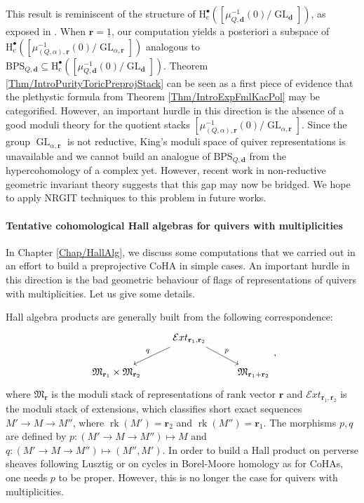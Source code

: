 \documentclass[11pt,english]{article}
\numberwithin{equation}{section}
\numberwithin{figure}{section}
\theoremstyle{definition}
\theoremstyle{plain}
\theoremstyle{remark}
\DeclareMathOperator{\GL}{GL}
\DeclareMathOperator{\rk}{rk}
\newcommand\dd{\mathbf{d}}
\newcommand\rr{\mathbf{r}}
\newcommand\HH{\mathrm{H}}
\begin{document}
This result is reminiscent of the structure of $\HH_{\mathrm{c}}^{\bullet}\left(\left[\mu_{Q,\dd}^{-1}(0)/\GL_{\dd}\right]\right)$,
as exposed in \cite{Dav23c}. When $\rr=\underline{1}$, our computation
yields a posteriori a subspace of $\HH_{\mathrm{c}}^{\bullet}\left(\left[\mu_{(Q,\alpha),\rr}^{-1}(0)/\GL_{\alpha,\rr}\right]\right)$
analogous to $\mathrm{BPS}_{Q,\dd}\subseteq\HH_{\mathrm{c}}^{\bullet}\left(\left[\mu_{Q,\dd}^{-1}(0)/\GL_{\dd}\right]\right)$.
Theorem \ref{Thm/IntroPurityToricPreprojStack} can be seen as a first
piece of evidence that the plethystic formula from Theorem \ref{Thm/IntroExpFmlKacPol}
may be categorified. However, an important hurdle in this direction
is the absence of a good moduli theory for the quotient stacks $\left[\mu_{(Q,\alpha),\rr}^{-1}(0)/\GL_{\alpha,\rr}\right]$.
Since the group $\GL_{\alpha,\rr}$ is not reductive, King's moduli
space of quiver representations is unavailable and we cannot build
an analogue of $\mathrm{BPS}_{Q,\dd}$ from the hypercohomology of
a complex yet. However, recent work in non-reductive geometric invariant
theory \cite{BDHK18,BDHK20,HHJ24} suggests that this gap may now
be bridged. We hope to apply NRGIT techniques to this problem in future
works.

\paragraph*{Tentative cohomological Hall algebras for quivers with multiplicities}

In Chapter \ref{Chap/HallAlg}, we discuss some computations that
we carried out in an effort to build a preprojective CoHA in simple
cases. An important hurdle in this direction is the bad geometric
behaviour of flags of representations of quivers with multiplicities.
Let us give some details.

Hall algebra products are generally built from the following correspondence:\[
\begin{tikzcd}[ampersand replacement=\&]
\& \mathcal{E}xt_{\rr_1,\rr_2} \ar[dl,"q"']\ar[dr,"p"] \& \\
\mathfrak{M}_{\rr_1}\times\mathfrak{M}_{\rr_2} \& \& \mathfrak{M}_{\rr_1+\rr_2}
\end{tikzcd}
,
\]where $\mathfrak{M}_{\rr}$ is the moduli stack of representations
of rank vector $\rr$ and $\mathcal{E}xt_{\rr_{1},\rr_{2}}$ is the
moduli stack of extensions, which classifies short exact sequences
$M'\rightarrow M\rightarrow M''$, where $\rk(M')=\rr_{2}$ and $\rk(M'')=\rr_{1}$.
The morphisms $p,q$ are defined by $p:(M'\rightarrow M\rightarrow M'')\mapsto M$
and $q:(M'\rightarrow M\rightarrow M'')\mapsto(M'',M')$. In order
to build a Hall product on perverse sheaves following Lusztig \cite{Lus91}
or on cycles in Borel-Moore homology as for CoHAs, one needs $p$
to be proper. However, this is no longer the case for quivers with
multiplicities.
\end{document}
